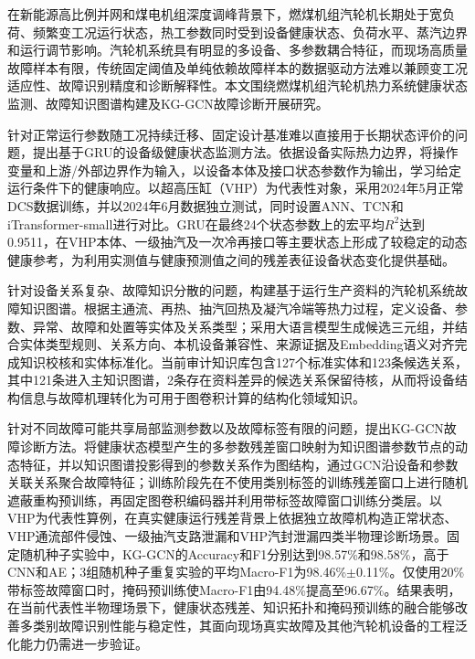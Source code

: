 \cnabstracttitle

在新能源高比例并网和煤电机组深度调峰背景下，燃煤机组汽轮机长期处于宽负荷、频繁变工况运行状态，热工参数同时受到设备健康状态、负荷水平、蒸汽边界和运行调节影响。汽轮机系统具有明显的多设备、多参数耦合特征，而现场高质量故障样本有限，传统固定阈值及单纯依赖故障样本的数据驱动方法难以兼顾变工况适应性、故障识别精度和诊断解释性。本文围绕燃煤机组汽轮机热力系统健康状态监测、故障知识图谱构建及KG-GCN故障诊断开展研究。

针对正常运行参数随工况持续迁移、固定设计基准难以直接用于长期状态评价的问题，提出基于GRU的设备级健康状态监测方法。依据设备实际热力边界，将操作变量和上游/外部边界作为输入，以设备本体及接口状态参数作为输出，学习给定运行条件下的健康响应。以超高压缸（VHP）为代表性对象，采用2024年5月正常DCS数据训练，并以2024年6月数据独立测试，同时设置ANN、TCN和iTransformer-small进行对比。GRU在最终24个状态参数上的宏平均$R^2$达到0.9511，在VHP本体、一级抽汽及一次冷再接口等主要状态上形成了较稳定的动态健康参考，为利用实测值与健康预测值之间的残差表征设备状态变化提供基础。

针对设备关系复杂、故障知识分散的问题，构建基于运行生产资料的汽轮机系统故障知识图谱。根据主通流、再热、抽汽回热及凝汽冷端等热力过程，定义设备、参数、异常、故障和处置等实体及关系类型；采用大语言模型生成候选三元组，并结合实体类型规则、关系方向、本机设备兼容性、来源证据及Embedding语义对齐完成知识校核和实体标准化。当前审计知识库包含127个标准实体和123条候选关系，其中121条进入主知识图谱，2条存在资料差异的候选关系保留待核，从而将设备结构信息与故障机理转化为可用于图卷积计算的结构化领域知识。

针对不同故障可能共享局部监测参数以及故障标签有限的问题，提出KG-GCN故障诊断方法。将健康状态模型产生的多参数残差窗口映射为知识图谱参数节点的动态特征，并以知识图谱投影得到的参数关系作为图结构，通过GCN沿设备和参数关联关系聚合故障特征；训练阶段先在不使用类别标签的训练残差窗口上进行随机遮蔽重构预训练，再固定图卷积编码器并利用带标签故障窗口训练分类层。以VHP为代表性算例，在真实健康运行残差背景上依据独立故障机构造正常状态、VHP通流部件侵蚀、一级抽汽支路泄漏和VHP汽封泄漏四类半物理诊断场景。固定随机种子实验中，KG-GCN的Accuracy和F1分别达到98.57\%和98.58\%，高于CNN和AE；3组随机种子重复实验的平均Macro-F1为98.46\%$\pm$0.11\%。仅使用20\%带标签故障窗口时，掩码预训练使Macro-F1由94.48\%提高至96.67\%。结果表明，在当前代表性半物理场景下，健康状态残差、知识拓扑和掩码预训练的融合能够改善多类别故障识别性能与稳定性，其面向现场真实故障及其他汽轮机设备的工程泛化能力仍需进一步验证。

